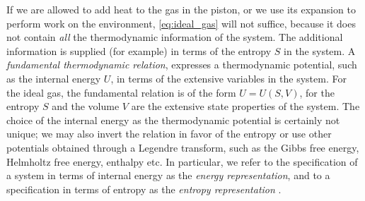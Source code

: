 If we are allowed to add heat to the gas in the piston, or we use its expansion to perform work on the environment, \cref{eq:ideal_gas} will not suffice, because it does not contain \emph{all} the thermodynamic information of the system. The additional information is supplied (for example) in terms of the entropy $S$ in the system. A \emph{fundamental thermodynamic relation}, expresses a thermodynamic potential, such as the internal energy $U$, in terms of the extensive variables in the system. For the ideal gas, the fundamental relation is of the form $U = U(S, V)$, for the entropy $S$ and the volume $V$ are the extensive state properties of the system. The choice of the internal energy as the thermodynamic potential is certainly not unique; we may also invert the relation in favor of the entropy or use other potentials obtained through a Legendre transform, such as the Gibbs free energy, Helmholtz free energy, enthalpy etc. In particular, we refer to the specification of a system in terms of internal energy as the \emph{energy representation}, and to a specification in terms of entropy as the \emph{entropy representation} \cite{VanderSchaft2021a}.

